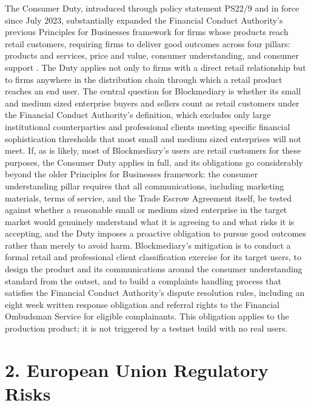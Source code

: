 \documentclass[12pt, a4paper]{article}
\begin{document}
The Consumer Duty, introduced through policy statement PS22/9 and in force since July
2023, substantially expanded the Financial Conduct Authority's previous Principles for
Businesses framework for firms whose products reach retail customers, requiring firms to
deliver good outcomes across four pillars: products and services, price and value,
consumer understanding, and consumer support \citep{fcaconsumerduty}. The Duty applies not
only to firms with a direct retail relationship but to firms anywhere in the distribution
chain through which a retail product reaches an end user. The central question for
Blockmediary is whether its small and medium sized enterprise buyers and sellers count as
retail customers under the Financial Conduct Authority's definition, which excludes only
large institutional counterparties and professional clients meeting specific financial
sophistication thresholds that most small and medium sized enterprises will not meet. If,
as is likely, most of Blockmediary's users are retail customers for these purposes, the
Consumer Duty applies in full, and its obligations go considerably beyond the older
Principles for Businesses framework: the consumer understanding pillar requires that all
communications, including marketing materials, terms of service, and the Trade Escrow
Agreement itself, be tested against whether a reasonable small or medium sized enterprise
in the target market would genuinely understand what it is agreeing to and what risks it is
accepting, and the Duty imposes a proactive obligation to pursue good outcomes rather than
merely to avoid harm. Blockmediary's mitigation is to conduct a formal retail and
professional client classification exercise for its target users, to design the product
and its communications around the consumer understanding standard from the outset, and to
build a complaints handling process that satisfies the Financial Conduct Authority's
dispute resolution rules, including an eight week written response obligation and
referral rights to the Financial Ombudsman Service for eligible complainants. This
obligation applies to the production product; it is not triggered by a testnet build with
no real users.

\section*{2. European Union Regulatory Risks}
\end{document}
